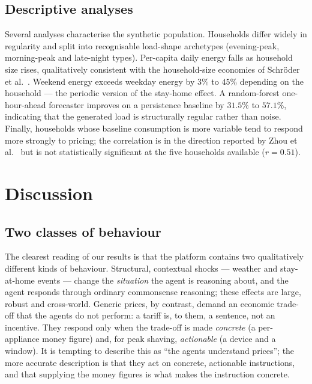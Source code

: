 \documentclass[11pt]{article}
\begin{document}
\subsection{Descriptive analyses}
Several analyses characterise the synthetic population. Households differ widely in regularity and split
into recognisable load-shape archetypes (evening-peak, morning-peak and late-night types). Per-capita
daily energy falls as household size rises, qualitatively consistent with the household-size economies of
Schr\"oder et al.\ \cite{schroder2013}. Weekend energy exceeds weekday energy by $3\%$ to $45\%$
depending on the household --- the periodic version of the stay-home effect. A random-forest one-hour-ahead
forecaster improves on a persistence baseline by $31.5\%$ to $57.1\%$, indicating that the generated load
is structurally regular rather than noise. Finally, households whose baseline consumption is more variable
tend to respond more strongly to pricing; the correlation is in the direction reported by Zhou et al.\
\cite{zhou2016} but is not statistically significant at the five households available ($r=0.51$).

\section{Discussion}
\label{sec:discussion}

\subsection{Two classes of behaviour}
The clearest reading of our results is that the platform contains two qualitatively different kinds of
behaviour. Structural, contextual shocks --- weather and stay-at-home events --- change the \emph{situation}
the agent is reasoning about, and the agent responds through ordinary commonsense reasoning; these effects
are large, robust and cross-world. Generic prices, by contrast, demand an economic trade-off that the
agents do not perform: a tariff is, to them, a sentence, not an incentive. They respond only when the
trade-off is made \emph{concrete} (a per-appliance money figure) and, for peak shaving, \emph{actionable}
(a device and a window). It is tempting to describe this as ``the agents understand prices''; the more
accurate description is that they act on concrete, actionable instructions, and that supplying the money
figures is what makes the instruction concrete.
\end{document}
